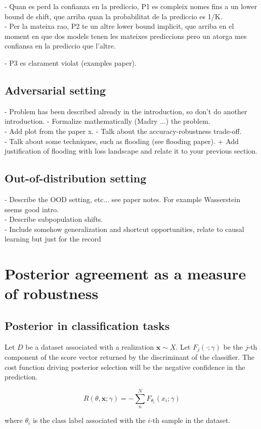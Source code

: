 - Quan es perd la confianza en la prediccio, P1 es compleix nomes fins a un lower
bound de shift, que arriba quan la probabilitat de la prediccio es 1/K. \\

- Per la mateixa rao, P2 te un altre lower bound implicit, que arriba en el moment
en que dos models tenen les mateixes prediccions pero un atorga mes confiansa en
la prediccio que l'altre.

- P3 es clarament violat (examples paper).

\subsection{Adversarial setting}

- Problem has been described already in the introduction, so don't do another introduction.
- Formalize mathematically (Madry ...) the problem. \\
- Add plot from the paper x.
- Talk about the accuracy-robustness trade-off. \\
- Talk about some techniques, such as flooding (see flooding paper). + Add justification
of flooding with loss landscape and relate it to your previous section. \\

\subsection{Out-of-distribution setting}

- Describe the OOD setting, etc... see paper notes. For example Wasserstein seems good intro. \\
- Describe subpopulation shifts. \\
- Include somehow generalization and shortcut opportunities, relate to causal learning but just for the record \\

\section{Posterior agreement as a measure of robustness}

\subsection{Posterior in classification tasks}

\begin{definition}
    Let $D$ be a dataset associated with a realization $\bm{x} \sim \underbar{X}$. Let $F_j(\cdot; \gamma)$ 
    be the $j$-th component of the score vector returned by the discriminant of the classifier.
    The cost function driving posterior selection will be the negative
    confidence in the prediction.

    $$
    R(\theta, \bm{x}; \gamma) = - \sum_n^N F_{\theta_i}(x_i; \gamma)
    $$

    where $\theta_i$ is the class label associated with the $i$-th sample in the dataset.
\end{definition}

